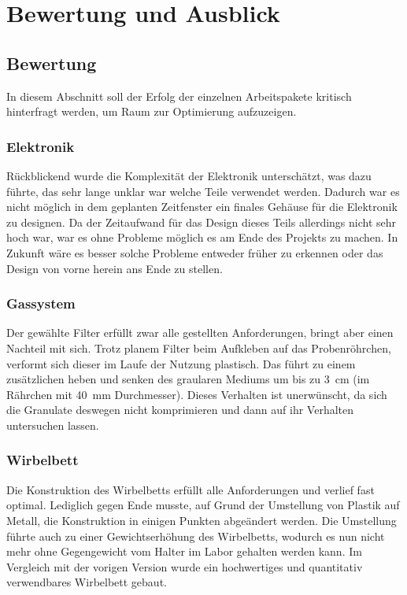 \chapter{Bewertung und Ausblick}


\section{Bewertung}

In diesem Abschnitt soll der Erfolg der einzelnen Arbeitspakete kritisch hinterfragt werden, um Raum zur Optimierung aufzuzeigen. 

\subsection{Elektronik}

Rückblickend wurde die Komplexität der Elektronik unterschätzt, was dazu führte, das sehr lange unklar war welche Teile verwendet werden. Dadurch war es nicht möglich in dem geplanten Zeitfenster ein finales Gehäuse für die Elektronik zu designen. Da der Zeitaufwand für das Design dieses Teils allerdings nicht sehr hoch war, war es ohne Probleme möglich es am Ende des Projekts zu machen. In Zukunft wäre es besser solche Probleme entweder früher zu erkennen oder das Design von vorne herein ans Ende zu stellen. 

\subsection{Gassystem}

Der gewählte Filter erfüllt zwar alle gestellten Anforderungen, bringt aber einen Nachteil mit sich. Trotz planem Filter beim Aufkleben auf das Probenröhrchen, verformt sich dieser im Laufe der Nutzung plastisch. Das führt zu einem zusätzlichen heben und senken des graularen Mediums um bis zu \SI{3}{cm} (im Rährchen mit \SI{40}{mm}  Durchmesser). Dieses Verhalten ist unerwünscht, da sich die Granulate deswegen nicht komprimieren und dann auf ihr Verhalten untersuchen lassen.  

\subsection{Wirbelbett}

Die Konstruktion des Wirbelbetts erfüllt alle Anforderungen und verlief fast optimal. Lediglich gegen Ende musste, auf Grund der Umstellung von Plastik auf Metall, die Konstruktion in einigen Punkten abgeändert werden. Die Umstellung führte auch zu einer Gewichtserhöhung des Wirbelbetts, wodurch es nun nicht mehr ohne Gegengewicht vom Halter im Labor gehalten werden kann.
Im Vergleich mit der vorigen Version wurde ein hochwertiges und quantitativ verwendbares Wirbelbett gebaut.

